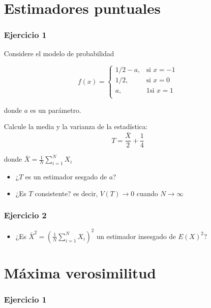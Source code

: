 \documentclass[
]{book}
\providecommand{\tightlist}{%
  \setlength{\itemsep}{0pt}\setlength{\parskip}{0pt}}
\begin{document}
\hypertarget{estimadores-puntuales}{%
\section{Estimadores puntuales}\label{estimadores-puntuales}}

\hypertarget{ejercicio-1-6}{%
\subsubsection{Ejercicio 1}\label{ejercicio-1-6}}

Considere el modelo de probabilidad

\[
    f(x)= 
\begin{cases}
    1/2-a,& \text{si } x=-1 \\ 
    1/2,& \text{si } x=0\\
    a,& 1 \text{si } x=1\\ 
\end{cases}
\]

donde \(a\) es un parámetro.

Calcule la media y la varianza de la estadística: \[T=\frac{\bar{X}}{2}+\frac{1}{4}\]

donde \(\bar{X}=\frac{1}{N}\sum_{i=1}^N X_i\)

\begin{itemize}
\item
  ¿\(T\) es un estimador sesgado de \(a\)?
\item
  ¿Es \(T\) consistente? es decir, \(V(T) \rightarrow 0\) cuando \(N\rightarrow \infty\)
\end{itemize}

\hypertarget{ejercicio-2-6}{%
\subsubsection{Ejercicio 2}\label{ejercicio-2-6}}

\begin{itemize}
\tightlist
\item
  ¿Es \(\bar{X}^2=(\frac{1}{N}\sum_{i=1}^N X_i)^2\) un estimador insesgado de \(E(X)^2\)?
\end{itemize}

\hypertarget{muxe1xima-verosimilitud-3}{%
\section{Máxima verosimilitud}\label{muxe1xima-verosimilitud-3}}

\hypertarget{ejercicio-1-7}{%
\subsubsection{Ejercicio 1}\label{ejercicio-1-7}}
\end{document}
